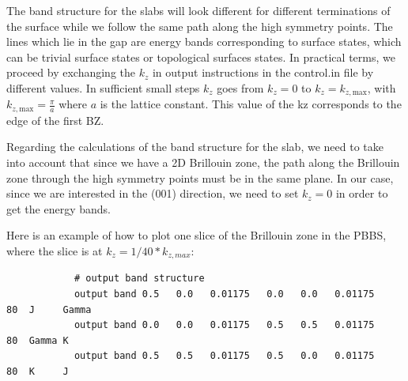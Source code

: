 	The band structure for the slabs will look different for different terminations of the surface while we follow the same path along the high symmetry points.
	The lines which lie in the gap are energy bands corresponding to surface states, which can be trivial surface states or topological surfaces states. 
	In practical terms, we proceed by exchanging the $k_z$ in output instructions in the control.in file by different values. 
	In sufficient small steps $k_z$ goes from $k_z=0$ to $k_z=k_{z,\text{max}}$, with $k_{z,\text{max}} = \frac{\pi}{a}$ where $a$ is the lattice constant. This value of the kz corresponds to the edge of the first BZ.
	
	Regarding the calculations of the band structure for the slab, we need to take into account that since we have a 2D Brillouin zone, the path along the Brillouin zone through the high symmetry points must be in the same plane. In our case, since we are interested in the (001) direction, we need to set $k_z = 0$ in order to get the energy bands.
	
	Here is an example of how to plot one slice of the Brillouin zone in the PBBS, where the slice is at $k_z = 1 / 40 * k_{z,max}$:
	\\
	\begin{minipage}[c]{\linewidth}	\vspace{15pt}
		\begin{verbatim}
			# output band structure
			output band 0.5   0.0   0.01175   0.0   0.0   0.01175    80  J     Gamma
			output band 0.0   0.0   0.01175   0.5   0.5   0.01175    80  Gamma K
			output band 0.5   0.5   0.01175   0.5   0.0   0.01175    80  K     J
		\end{verbatim} \vspace{0.2cm}
	\end{minipage}
	
